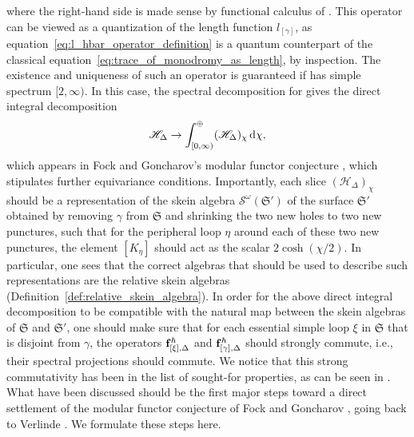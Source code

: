 \documentclass[10pt,a4paper]{amsart}
\numberwithin{equation}{section}
\theoremstyle{definition}
\begin{document}
where the right-hand side is made sense by functional calculus of . This operator  can be viewed as a quantization of the length function $l_{[\gamma]}$, as equation~\eqref{eq:l_hbar_operator_definition} is a quantum counterpart of the classical equation~\eqref{eq:trace_of_monodromy_as_length}, by inspection.
The existence and uniqueness of such an operator  is guaranteed if  has simple spectrum $[2,\infty)$. In this case, the spectral decomposition for  gives the direct integral decomposition
\begin{align}
\label{eq:direct_integral_decomposition}
\mathscr{H}_\Delta \to \int^\oplus_{[0,\infty)} (\mathscr{H}_\Delta)_\chi \, {\rm d}\chi,
\end{align}
which appears in Fock and Goncharov's modular functor conjecture \cite{F97, FG09}, which stipulates further equivariance conditions. Importantly, each slice $(\mathscr{H}_\Delta)_\chi$ should be a representation of the skein algebra $\mathcal{S}^\omega(\mathfrak{S}')$ of the surface $\mathfrak{S}'$ obtained by removing $\gamma$ from $\mathfrak{S}$ and shrinking the two new holes to two new punctures, such that for the peripheral loop $\eta$ around each of these two new punctures, the element $[K_\eta]$ should act as the scalar $2\cosh(\chi/2)$. In particular, one sees that the correct algebras that should be used to describe such representations are the relative skein algebras (Definition~\ref{def:relative_skein_algebra}). In order for the above direct integral decomposition to be compatible with the natural map between the skein algebras of $\mathfrak{S}$ and $\mathfrak{S}'$, one should make sure that for each essential simple loop $\xi$ in $\mathfrak{S}$ that is disjoint from $\gamma$, the operators ${\bf f}^\hbar_{[\xi],\Delta}$ and ${\bf f}^\hbar_{[\gamma],\Delta}$ should strongly commute, i.e., their spectral projections should commute. We notice that this strong commutativity has been in the list of sought-for properties, as can be seen in \cite[p.~160, item~6]{CF2} \cite[p.~26, item~3]{F97} \cite[Section~15.1, item~(b)]{T}.
What have been discussed should be the first major steps toward a direct settlement of the modular functor conjecture of Fock and Goncharov \cite{F97, FG09}, going back to Verlinde \cite{Verlinde}. We formulate these steps here.
\end{document}
